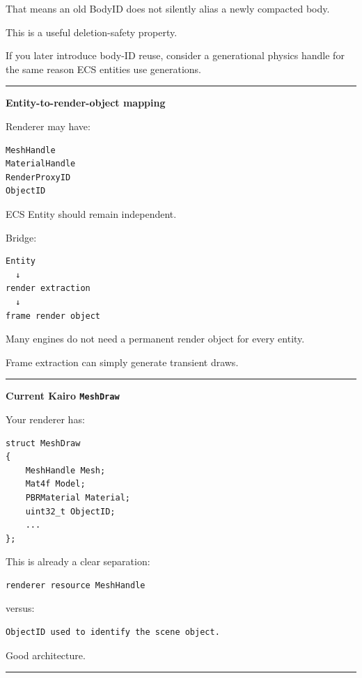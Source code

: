 That means an old BodyID does not silently alias a newly compacted body.

This is a useful deletion-safety property.

If you later introduce body-ID reuse, consider a generational physics handle for the same reason ECS entities use generations.

\begin{center}\rule{0.5\linewidth}{0.5pt}\end{center}

\textbf{Entity-to-render-object mapping}

Renderer may have:

\begin{verbatim}
MeshHandle
MaterialHandle
RenderProxyID
ObjectID
\end{verbatim}

ECS Entity should remain independent.

Bridge:

\begin{verbatim}
Entity
  ↓
render extraction
  ↓
frame render object
\end{verbatim}

Many engines do not need a permanent render object for every entity.

Frame extraction can simply generate transient draws.

\begin{center}\rule{0.5\linewidth}{0.5pt}\end{center}

\textbf{Current Kairo \texttt{MeshDraw}}

Your renderer has:

\begin{verbatim}
struct MeshDraw
{
    MeshHandle Mesh;
    Mat4f Model;
    PBRMaterial Material;
    uint32_t ObjectID;
    ...
};
\end{verbatim}

This is already a clear separation:

\begin{verbatim}
renderer resource MeshHandle
\end{verbatim}

versus:

\begin{verbatim}
ObjectID used to identify the scene object.
\end{verbatim}

Good architecture.

\begin{center}\rule{0.5\linewidth}{0.5pt}\end{center}

